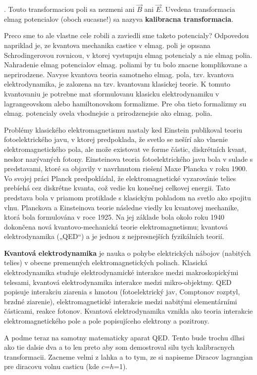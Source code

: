 \documentclass[../../main.tex]{subfiles}
\begin{document}
. Touto transformaciou poli sa nezmeni ani $\vec{B}$ ani $\vec{E}$. Uvedena transformacia elmag potencialov (oboch sucasne!) sa nazyva \textbf{kalibracna transformacia}.\par
Preco sme to ale vlastne cele robili a zaviedli sme taketo potencialy? Odpovedou napriklad je, ze kvantova mechanika castice v elmag. poli je opısana Schrodingerovou rovnicou, v ktorej vystupuju elmag potencialy a nie elmag polia. Nahradenie elmag potencialov elmag. poliami by tu bolo znacne komplikovane a neprirodzene. Navyse kvantova teoria samotneho elmag. pola, tzv. kvantova elektrodynamika, je
zalozena na tzv. kvantovanı klasickej teorie. K tomuto kvantovaniu je potrebne mat sformulovanu klasicku elektrodynamiku v lagrangeovskom alebo hamiltonovskom
formalizme. Pre oba tieto formalizmy su elmag. potencialy ovela vhodnejsie a prirodzenejsie ako elmag. polia.\par
Problémy klasického elektromagnetismu nastaly ked Einstein publikoval teoriu fotoelektrického javu, v ktorej predpoklada, že svetlo se nešírí ako vlnenie elektromagnetického pola, ale može existovat ve forme částic, diskrétních kvant, neskor nazývaných fotony. Einsteinova teoria fotoelektrického javu bola v sulade s predstavami, ktoré sa objavily v navrhnutom riešení Maxe Plancka v roku 1900. Vo svojej práci Planck predpokládal, že elektromagnetické vyzarovánie telies prebíehá cez diskrétne kvanta, což vedie ku konečnej celkovej energii. Tato predstava bola v priamom protiklade s klasickým pohladom na svetlo ako spojitu vlnu. Planckova a Einsteinova teorie následne viedly ku kvantovej mechanike, ktorá bola formulována v roce 1925. Na jej základe bola okolo roku 1940 dokončena nová kvantovo-mechanická teorie elektromagnetismu; kvantová elektrodynamika („QED“) a je jednou z nejpresnejších fyzikálních teorií.\par
\textbf{Kvantová elektrodynamika} je nauka o pohybe elektrických nábojov (nabitých telies) v obecne premenných elektromagnetických poliach. Klasická elektrodynamika studuje elektrodynamické interakce medzi makroskopickými telesami, kvantová elektrodynamika interakce medzi mikro-objektmy. QED popisuje interakciu ziarenia s hmotou (fotoelektrický jav, Comptonov rozptyl, brzdné ziarenie), elektromagnetické interakcie medzi nabitými elementárními částicami, reakce fotonov. Kvantová elektrodynamika vznikla ako teoria interakcie elektromagnetického pole a pole popisujíceho elektrony a pozitrony.\par
A podme teraz na samotny matematicky aparat QED. Tento bude trochu dlhsi ako tie dalsie dva a to len preto aby som demostroval silu tych kalibracnych transformacii. Zacneme velmi z lahka a to tym, ze si napiseme Diracov lagrangian pre diracovu volnu casticu (kde $c$=$h$=1).
\end{document}
